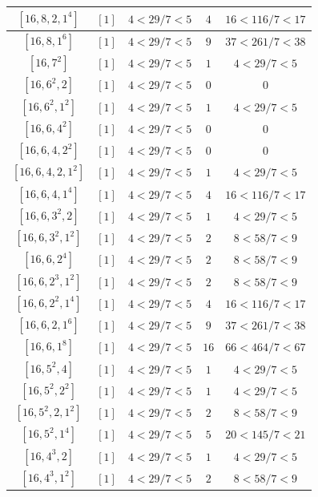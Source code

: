 \documentclass{article}%
\begin{document}
\begin{center}
\begin{longtable}{||c|c|c|c|c||}
$[16, 8, 2, 1^{4}]$ & $[1]$ & $4 < 29/7 < 5$ & $4$ & $16 < 116/7 < 17$ \\ \hline 
$[16, 8, 1^{6}]$ & $[1]$ & $4 < 29/7 < 5$ & $9$ & $37 < 261/7 < 38$ \\ \hline 
$[16, 7^{2}]$ & $[1]$ & $4 < 29/7 < 5$ & $1$ & $4 < 29/7 < 5$ \\ \hline 
$[16, 6^{2}, 2]$ & $[1]$ & $4 < 29/7 < 5$ & $0$ & $0$ \\ \hline 
$[16, 6^{2}, 1^{2}]$ & $[1]$ & $4 < 29/7 < 5$ & $1$ & $4 < 29/7 < 5$ \\ \hline 
$[16, 6, 4^{2}]$ & $[1]$ & $4 < 29/7 < 5$ & $0$ & $0$ \\ \hline 
$[16, 6, 4, 2^{2}]$ & $[1]$ & $4 < 29/7 < 5$ & $0$ & $0$ \\ \hline 
$[16, 6, 4, 2, 1^{2}]$ & $[1]$ & $4 < 29/7 < 5$ & $1$ & $4 < 29/7 < 5$ \\ \hline 
$[16, 6, 4, 1^{4}]$ & $[1]$ & $4 < 29/7 < 5$ & $4$ & $16 < 116/7 < 17$ \\ \hline 
$[16, 6, 3^{2}, 2]$ & $[1]$ & $4 < 29/7 < 5$ & $1$ & $4 < 29/7 < 5$ \\ \hline 
$[16, 6, 3^{2}, 1^{2}]$ & $[1]$ & $4 < 29/7 < 5$ & $2$ & $8 < 58/7 < 9$ \\ \hline 
$[16, 6, 2^{4}]$ & $[1]$ & $4 < 29/7 < 5$ & $2$ & $8 < 58/7 < 9$ \\ \hline 
$[16, 6, 2^{3}, 1^{2}]$ & $[1]$ & $4 < 29/7 < 5$ & $2$ & $8 < 58/7 < 9$ \\ \hline 
$[16, 6, 2^{2}, 1^{4}]$ & $[1]$ & $4 < 29/7 < 5$ & $4$ & $16 < 116/7 < 17$ \\ \hline 
$[16, 6, 2, 1^{6}]$ & $[1]$ & $4 < 29/7 < 5$ & $9$ & $37 < 261/7 < 38$ \\ \hline 
$[16, 6, 1^{8}]$ & $[1]$ & $4 < 29/7 < 5$ & $16$ & $66 < 464/7 < 67$ \\ \hline 
$[16, 5^{2}, 4]$ & $[1]$ & $4 < 29/7 < 5$ & $1$ & $4 < 29/7 < 5$ \\ \hline 
$[16, 5^{2}, 2^{2}]$ & $[1]$ & $4 < 29/7 < 5$ & $1$ & $4 < 29/7 < 5$ \\ \hline 
$[16, 5^{2}, 2, 1^{2}]$ & $[1]$ & $4 < 29/7 < 5$ & $2$ & $8 < 58/7 < 9$ \\ \hline 
$[16, 5^{2}, 1^{4}]$ & $[1]$ & $4 < 29/7 < 5$ & $5$ & $20 < 145/7 < 21$ \\ \hline 
$[16, 4^{3}, 2]$ & $[1]$ & $4 < 29/7 < 5$ & $1$ & $4 < 29/7 < 5$ \\ \hline 
$[16, 4^{3}, 1^{2}]$ & $[1]$ & $4 < 29/7 < 5$ & $2$ & $8 < 58/7 < 9$ \\ \hline 

\end{longtable}
\end{center}
\end{document}
